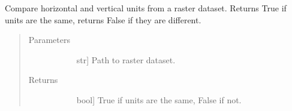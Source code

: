 \documentclass[letterpaper,10pt,english]{sphinxmanual}
\begin{document}
\begin{fulllineitems}
\label{\detokenize{elevationTools:elevationTools.compareSpatialRefUnits}}
Compare horizontal and vertical units from a raster dataset. Returns True if units are the same, returns False if they are different.
\begin{quote}\begin{description}
\item[{Parameters}] \leavevmode\begin{description}
\item[{}] \leavevmode{[}str{]}
Path to raster dataset.

\end{description}

\item[{Returns}] \leavevmode\begin{description}
\item[{}] \leavevmode{[}bool{]}
True if units are the same, False if not.

\end{description}

\end{description}\end{quote}

\end{fulllineitems}

\end{document}
